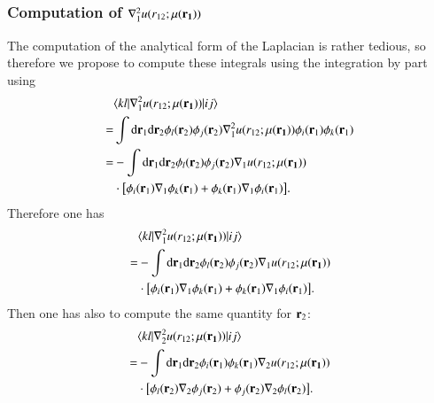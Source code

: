 \documentclass[aip,jcp,reprint,noshowkeys,superscriptaddress]{revtex4-1}
\newcommand{\matelem}[3]{\langle #1 | #2 | #3 \rangle}
\newcommand{\br}[0]{{\bf {r}}}
\newcommand{\mur}[1]{\mu({\bf r_{#1}})}
\begin{document}
\subsubsection{Computation of $\nabla_1^2  u(r_{12};\mur{1})$ }
The computation of the analytical form of the Laplacian is rather tedious, so therefore we propose to compute these integrals using the integration by part using 
\begin{equation}
 \begin{aligned}
&  \matelem{kl}{\nabla^2_1 u(r_{12};\mur{1})}{ij} \\ 
= & \int \text{d}\br_{1} \text{d}\br_{2}   \phi_l(\br_2) \phi_j(\br_2) \nabla^2_1 u(r_{12};\mur{1}) \phi_i(\br_1) \phi_k(\br_1) \\
= & -\int \text{d}\br_{1} \text{d}\br_{2}  \phi_l(\br_2) \phi_j(\br_2) \nabla_1 u(r_{12};\mur{1}) \\ & \cdot \big[ \phi_i(\br_1) \nabla_1 \phi_k(\br_1) +  \phi_k(\br_1) \nabla_1 \phi_i(\br_1)\big].
 \end{aligned}
\end{equation}
Therefore one has 
\begin{equation}
 \label{eq:lapl_1}
 \begin{aligned}
&  \matelem{kl}{\nabla^2_1 u(r_{12};\mur{1})}{ij} \\ 
= & -\int \text{d}\br_{1} \text{d}\br_{2}  \phi_l(\br_2) \phi_j(\br_2) \nabla_1 u(r_{12};\mur{1}) \\ & \cdot \big[ \phi_i(\br_1) \nabla_1 \phi_k(\br_1) +  \phi_k(\br_1) \nabla_1 \phi_i(\br_1)\big].
 \end{aligned}
\end{equation}
Then one has also to compute the same quantity for $\br_2$:
\begin{equation}
 \label{eq:lapl_2}
 \begin{aligned}
&  \matelem{kl}{\nabla^2_2 u(r_{12};\mur{1})}{ij} \\ 
= & -\int \text{d}\br_{1} \text{d}\br_{2} \phi_i(\br_1) \phi_k(\br_1) \nabla_2 u(r_{12};\mur{1}) \\ & \cdot \big[\phi_l(\br_2)  \nabla_2  \phi_j(\br_2) + \phi_j(\br_2)  \nabla_2  \phi_l(\br_2)   \big].
 \end{aligned}
\end{equation}
\end{document}
